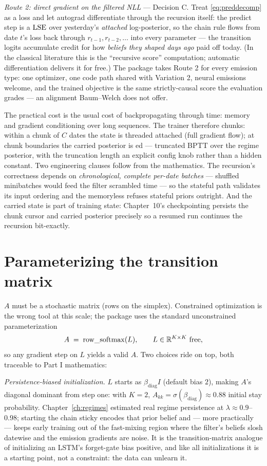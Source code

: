\emph{Route 2: direct gradient on the filtered NLL} --- Decision C.
Treat \eqref{eq:preddecomp} as a loss and let autograd differentiate
through the recursion itself: the predict step is a
$\operatorname{LSE}$ over yesterday's \emph{attached} log-posterior, so the chain rule
flows from date $t$'s loss back through $r_{t-1}, r_{t-2}, \dots$ into
every parameter --- the transition logits accumulate credit for how
\emph{beliefs they shaped days ago} paid off today. (In the classical
literature this is the ``recursive score'' computation; automatic
differentiation delivers it for free.) The package takes Route 2 for
every emission type: one optimizer, one code path shared with
Variation 2, neural emissions welcome, and the trained objective is the
same strictly-causal score the evaluation grades --- an alignment
Baum--Welch does not offer.

The practical cost is the usual cost of backpropagating through time:
memory and gradient conditioning over long sequences. The trainer
therefore chunks: within a chunk of $C$ dates the state is threaded
attached (full gradient flow); at chunk boundaries the carried posterior
is ed --- truncated BPTT over the regime posterior, with
the truncation length an explicit config knob rather than a hidden
constant. Two engineering clauses follow from the mathematics. The
recursion's correctness depends on \emph{chronological, complete
per-date batches} --- shuffled minibatches would feed the filter
scrambled time --- so the stateful path validates its input ordering and
the memoryless  refuses stateful priors outright.
And the carried state is part of training state: Chapter~10's
checkpointing persists the chunk cursor and carried posterior precisely
so a resumed run continues the recursion bit-exactly.

\section{Parameterizing the transition matrix}\label{sec:transition}

$A$ must be a stochastic matrix (rows on the simplex). Constrained
optimization is the wrong tool at this scale; the package uses the
standard unconstrained parameterization
\[
  A \;=\; \operatorname{row\_softmax}(L),
  \qquad L \in \mathbb{R}^{K \times K}\ \text{free},
\]
so any gradient step on $L$ yields a valid $A$. Two choices ride on top,
both traceable to Part I mathematics:

\emph{Persistence-biased initialization.} $L$ starts as
$\beta_{\mathrm{diag}} I$ (default bias $2$), making $A$'s diagonal
dominant from step one: with $K = 2$,
$A_{kk} = \sigma(\beta_{\mathrm{diag}}) \approx 0.88$ initial stay
probability. Chapter~\ref{ch:regimes} estimated real regime persistence
at $\lambda \approx 0.9$--$0.98$; starting the chain sticky encodes that
prior belief and --- more practically --- keeps early training out of
the fast-mixing region where the filter's beliefs slosh datewise and the
emission gradients are noise. It is the transition-matrix analogue of
initializing an LSTM's forget-gate bias positive, and like all
initializations it is a starting point, not a constraint: the data can
unlearn it.

